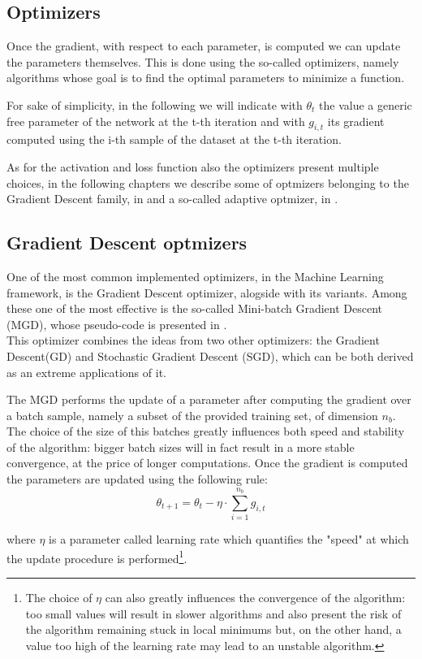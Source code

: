 \subsection{Optimizers}\label{optalg}

Once the gradient, with respect to each parameter, is computed we can update the parameters themselves. This is done using the so-called optimizers, namely algorithms whose goal is to find the optimal parameters to minimize a function.

For sake of simplicity, in the following we will indicate with $\theta_t$ the value a generic free parameter of the network at the t-th iteration and with $g_{i,t}$ its gradient computed using the i-th sample of the dataset at the t-th iteration.

As for the activation and loss function also the optimizers present multiple choices, in the following chapters we describe some of optmizers belonging to the Gradient Descent family, in  and a so-called adaptive optmizer, in .

\subsection{Gradient Descent optmizers}
\label{opt_dg}
One of the most common implemented optimizers, in the Machine Learning framework, is the Gradient Descent optimizer, alogside with its variants\cite{var_grad}. Among these one of the most effective is the so-called Mini-batch Gradient Descent (MGD), whose pseudo-code is presented in . \\
This optimizer combines the ideas from two other optimizers: the Gradient Descent(GD) and Stochastic Gradient Descent (SGD), which can be both derived as an extreme applications of it.

The MGD performs the update of a parameter after computing the gradient over a batch sample, namely a subset of the provided training set, of dimension $n_b$. The choice of the size of this batches greatly influences both speed and stability of the algorithm: bigger batch sizes will in fact result in a more stable convergence, at the price of longer computations. Once the gradient is computed the parameters are updated using the following rule:
\begin{equation}
\theta_{t+1}=\theta_t-\eta \cdot \sum_{i=1}^{n_b} g_{i,t}
\end{equation}

where $\eta$ is a parameter called learning rate which quantifies the "speed" at which the update procedure is performed\footnote{The choice of $\eta$ can also greatly influences the convergence of the algorithm: too small values will result in slower algorithms and also present the risk of the algorithm remaining stuck in local minimums but, on the other hand, a value too high of the learning rate may lead to an unstable algorithm.}. 

